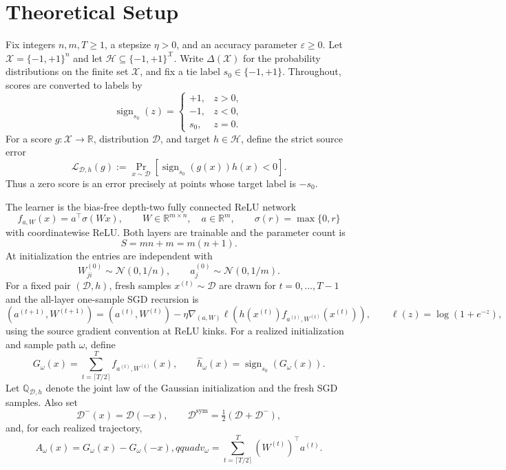 \section{Theoretical Setup}
\label{sec:setup}

Fix integers $n,m,T\geq 1$, a stepsize $\eta>0$, and an accuracy
parameter $\varepsilon\geq 0$.  Let
$\mathcal X=\{-1,+1\}^{n}$ and let
$\mathcal H\subseteq\{-1,+1\}^{\mathcal X}$.  Write
$\Delta(\mathcal X)$ for the probability distributions on the finite set
$\mathcal X$, and fix a tie label $s_0\in\{-1,+1\}$.  Throughout, scores are
converted to labels by
\[
\operatorname{sign}_{s_0}(z)=
\begin{cases}
 +1,&z>0,\\
 -1,&z<0,\\
 s_0,&z=0.
\end{cases}
\]
For a score $g:\mathcal X\to\mathbb R$, distribution $\mathcal D$, and
target $h\in\mathcal H$, define the strict source error
\[
\mathcal L_{\mathcal D,h}(g)
 :=\Pr_{x\sim\mathcal D}\left[
 \operatorname{sign}_{s_0}(g(x))h(x)<0\right].
\]
Thus a zero score is an error precisely at points whose target label is
$-s_0$.

The learner is the bias-free depth-two fully connected ReLU network
\[
 f_{a,W}(x)=a^\top\sigma(Wx),\qquad
 W\in\mathbb R^{m\times n},\quad a\in\mathbb R^m,
 \qquad \sigma(r)=\max\{0,r\}
\]
with coordinatewise ReLU.  Both layers are trainable and the parameter count
is
\[
 S=mn+m=m(n+1).
\]
At initialization the entries are independent with
\[
 W^{(0)}_{ji}\sim\mathcal N(0,1/n),\qquad
 a^{(0)}_j\sim\mathcal N(0,1/m).
\]
For a fixed pair $(\mathcal D,h)$, fresh samples
$x^{(t)}\sim\mathcal D$ are drawn for $t=0,\ldots,T-1$ and the all-layer
one-sample SGD recursion is
\[
 (a^{(t+1)},W^{(t+1)})=(a^{(t)},W^{(t)})
 -\eta\nabla_{(a,W)}
 \ell\!\left(h(x^{(t)})f_{a^{(t)},W^{(t)}}(x^{(t)})\right),
 \qquad \ell(z)=\log(1+e^{-z}),
\]
using the source gradient convention at ReLU kinks.  For a realized
initialization and sample path $\omega$, define
\[
 G_\omega(x)=\sum_{t=\lceil T/2\rceil}^{T}
 f_{a^{(t)},W^{(t)}}(x),
 \qquad
 \widehat h_\omega(x)=\operatorname{sign}_{s_0}(G_\omega(x)).
\]
Let $\mathbb Q_{\mathcal D,h}$ denote the joint law of the Gaussian
initialization and the fresh SGD samples.  Also set
\[
 \mathcal D^-(x)=\mathcal D(-x),\qquad
 \mathcal D^{\mathrm{sym}}=\tfrac12(\mathcal D+\mathcal D^-),
\]
and, for each realized trajectory,
\[
 A_\omega(x)=G_\omega(x)-G_\omega(-x),qquad
 v_\omega=\sum_{t=\lceil T/2\rceil}^{T}(W^{(t)})^\top a^{(t)}.
\]

